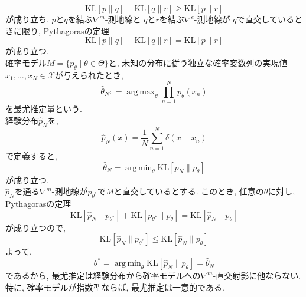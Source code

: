 \documentclass{jsarticle}
\theoremstyle{definition}
\DeclareMathOperator*{\argmin}{arg\,min}
\DeclareMathOperator*{\argmax}{arg\,max}
\newcommand{\coloneqq}{\mathrel{\mathop{:}=}}
\begin{document}
   \[
           \text{KL}[p\|q]+\text{KL}[q\|r]\geq\text{KL}[p\|r]
   \]
   が成り立ち, 
   $p$と$q$を結ぶ$\nabla^m$-測地線と
   $q$と$r$を結ぶ$\nabla^e$-測地線が
   $q$で直交しているときに限り, Pythagorasの定理
   \[
           \text{KL}[p\|q]+\text{KL}[q\|r]=\text{KL}[p\|r]
   \]
   が成り立つ.\\
   確率モデル$M=\{p_\theta\mid\theta\in\Theta\}$と, 
   未知の分布に従う独立な確率変数列の実現値$x_1,\dots,x_N\in\mathcal{X}$が与えられたとき, 
   \[
           \hat{\theta}_N\coloneqq \argmax_{\theta}\prod_{n=1}^N p_\theta(x_n)
   \]
   を最尤推定量という.\\
   経験分布$\hat{p}_N$を,
   \[
           \hat{p}_N(x)=\frac{1}{N}\sum_{n=1}^N\delta(x-x_n)
   \]
   で定義すると, 
   \[
           \hat{\theta}_N=\argmin_{\theta}\text{KL}[\hat{p}_N\|p_\theta]
   \]
   が成り立つ.\\
   $\hat{p}_N$を通る$\nabla^m$-測地線が$p_{\theta^*}$で$M$と直交しているとする. 
   このとき, 任意の$\theta$に対し, Pythagorasの定理
   \[
           \text{KL}[\hat{p}_N\|p_{\theta^*}]+\text{KL}[p_{\theta^*}\|p_\theta]
        =\text{KL}[\hat{p}_N\|p_{\theta}]
   \]
   が成り立つので, 
   \[
           \text{KL}[\hat{p}_N\|p_{\theta^*}]
        \leq \text{KL}[\hat{p}_N\|p_{\theta}]
   \]
   よって, 
   \[
           \theta^*=\argmin_{\theta} \text{KL}[\hat{p}_N\|p_{\theta}]=\hat{\theta}_N
   \]
   であるから, 最尤推定は経験分布から確率モデルへの$\nabla^m$-直交射影に他ならない. 
   特に, 確率モデルが指数型ならば, 最尤推定は一意的である.
   
\end{document}
